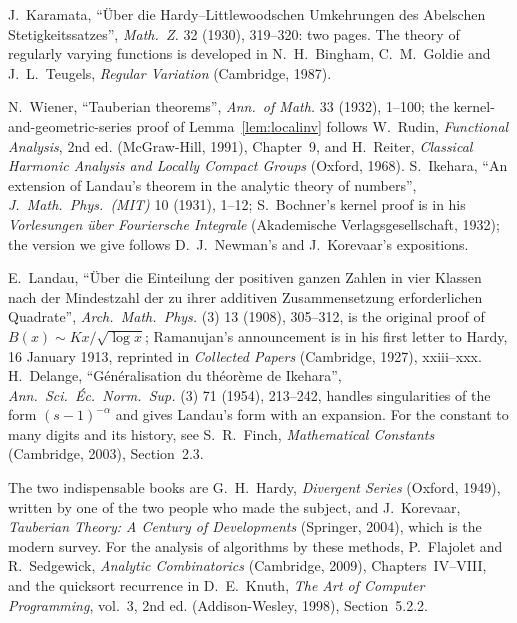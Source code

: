 J.~Karamata, ``\"Uber die Hardy--Little\-wood\-schen Um\-keh\-rungen des Abel\-schen Stetig\-keits\-satzes'', \emph{Math.\ Z.} 32 (1930), 319--320: two pages. The theory
of regularly varying functions is developed in N.~H.~Bingham, C.~M.~Goldie and J.~L.~Teugels, \emph{Regular Variation} (Cambridge, 1987).

N.~Wiener, ``Tauberian theorems'', \emph{Ann.\ of Math.} 33 (1932), 1--100; the kernel-and-geometric-series proof of Lemma~\ref{lem:localinv} follows
W.~Rudin, \emph{Functional Analysis}, 2nd ed. (McGraw-Hill, 1991), Chapter~9, and H.~Reiter, \emph{Classical Harmonic Analysis and Locally Compact Groups}
(Oxford, 1968). S.~Ikehara, ``An extension of Landau's theorem in the analytic theory of numbers'', \emph{J.\ Math.\ Phys.\ (MIT)} 10 (1931), 1--12;
S.~Bochner's kernel proof is in his \emph{Vorlesungen \"uber Fouriersche Integrale} (Akademische Verlagsgesellschaft, 1932); the version we give follows
D.~J.~Newman's and J.~Korevaar's expositions.

E.~Landau, ``\"Uber die Einteilung der positiven ganzen Zahlen in vier Klassen nach der Mindestzahl der zu ihrer additiven Zusammensetzung erforderlichen
Quadrate'', \emph{Arch.\ Math.\ Phys.} (3) 13 (1908), 305--312, is the original proof of $B(x)\sim Kx/\sqrt{\log x}$; Ramanujan's announcement is in his
first letter to Hardy, 16 January 1913, reprinted in \emph{Collected Papers} (Cambridge, 1927), xxiii--xxx. H.~Delange, ``G\'en\'eralisation du
th\'eor\`eme de Ikehara'', \emph{Ann.\ Sci.\ \'Ec.\ Norm.\ Sup.} (3) 71 (1954), 213--242, handles singularities of the form $(s-1)^{-\alpha}$ and gives
Landau's form with an expansion. For the constant to many digits and its history, see S.~R.~Finch, \emph{Mathematical Constants} (Cambridge, 2003),
Section~2.3.

The two indispensable books are G.~H.~Hardy, \emph{Divergent Series} (Oxford, 1949), written by one of the two people who made the subject, and
J.~Korevaar, \emph{Tauberian Theory: A Century of Developments} (Springer, 2004), which is the modern survey. For the analysis of algorithms by these
methods, P.~Flajolet and R.~Sedgewick, \emph{Analytic Combinatorics} (Cambridge, 2009), Chapters~IV--VIII, and the quicksort recurrence in
D.~E.~Knuth, \emph{The Art of Computer Programming}, vol.~3, 2nd ed. (Addison-Wesley, 1998), Section~5.2.2.
